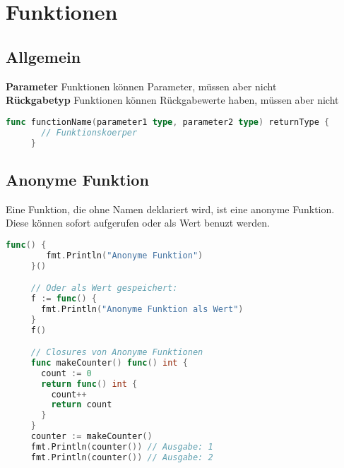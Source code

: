 \documentclass[twoside,a4paper,12pt]{article}
\begin{document}
\newpage
\section{Funktionen}
\subsection{Allgemein} 
\textbf{Parameter} Funktionen können Parameter, müssen aber nicht \\ 
\textbf{Rückgabetyp} Funktionen können Rückgabewerte haben, müssen aber nicht \\
\begin{center}
  \begin{minipage}{1.0\textwidth} 
    \begin{lstlisting}[language=Go]
     func functionName(parameter1 type, parameter2 type) returnType {
       // Funktionskoerper
     }
    \end{lstlisting}
  \end{minipage}
\end{center}

\subsection{Anonyme Funktion}
Eine Funktion, die ohne Namen deklariert wird, ist eine anonyme Funktion. \\ 
Diese können sofort aufgerufen oder als Wert benuzt werden.
\begin{center}
  \begin{minipage}{1.0\textwidth}
    \begin{lstlisting}[language=Go]
		 func() {
        fmt.Println("Anonyme Funktion")
     }()

     // Oder als Wert gespeichert:
     f := func() {
       fmt.Println("Anonyme Funktion als Wert")
     }
     f()

     // Closures von Anonyme Funktionen
     func makeCounter() func() int {
       count := 0
       return func() int {
         count++
         return count
       }
     }
     counter := makeCounter()
     fmt.Println(counter()) // Ausgabe: 1
     fmt.Println(counter()) // Ausgabe: 2
    \end{lstlisting}
  \end{minipage}
\end{center}  

\newpage
\end{document}
